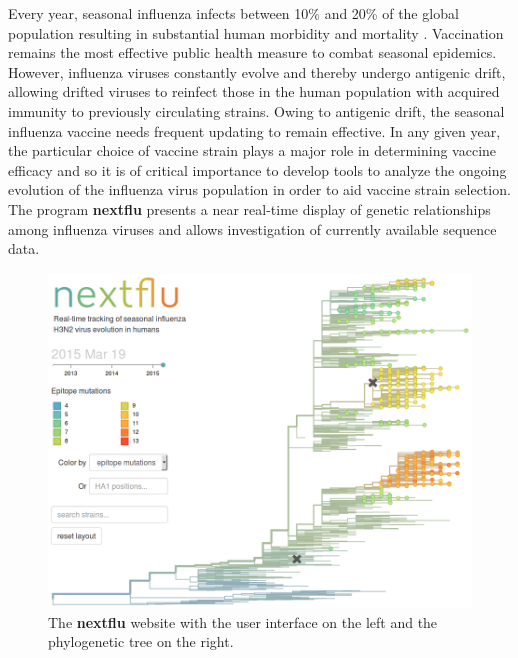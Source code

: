 \documentclass{bioinfo}
\newcommand{\nextflu}{\textbf{nextflu}}
\begin{document}

Every year, seasonal influenza infects between 10\% and 20\% of the global population resulting in substantial human morbidity and mortality \citep{flufactsheet}.
Vaccination remains the most effective public health measure to combat seasonal epidemics.
However, influenza viruses constantly evolve and thereby undergo antigenic drift, allowing drifted viruses to reinfect those in the human population with acquired immunity to previously circulating strains.
Owing to antigenic drift, the seasonal influenza vaccine needs frequent updating to remain effective.
In any given year, the particular choice of vaccine strain plays a major role in determining vaccine efficacy and so it is of critical importance to develop tools to analyze the ongoing evolution of the influenza virus population in order to aid vaccine strain selection.
The program \nextflu{} presents a near real-time display of genetic relationships among influenza viruses and allows investigation of currently available sequence data.

\begin{figure}[t!]
	\centering
	\includegraphics[width=0.99\columnwidth]{figures/tree}
	\caption[]{The \nextflu{} website with the user interface on the left and the phylogenetic tree on the right.}
	\label{fig:tree}
\end{figure}
\end{document}
